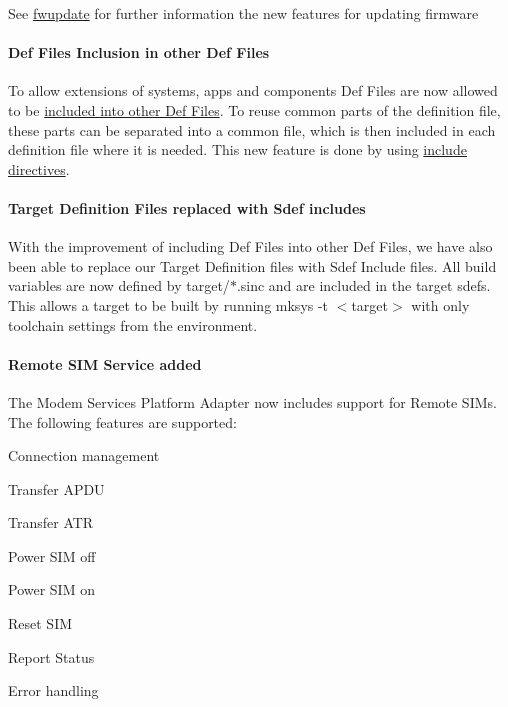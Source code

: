 See \hyperlink{c_fwupdate}{fwupdate} for further information the new features for updating firmware\hypertarget{releaseNotes17050_rn17_05_FeaturesIncDefFiles}{}\paragraph{Def Files Inclusion in other Def Files}\label{releaseNotes17050_rn17_05_FeaturesIncDefFiles}
To allow extensions of systems, apps and components Def Files are now allowed to be \hyperlink{defFilesFormat_defFileFormatIncludeDirectives}{included into other Def Files}. To reuse common parts of the definition file, these parts can be separated into a common file, which is then included in each definition file where it is needed. This new feature is done by using \hyperlink{defFilesFormat_defFileFormatIncludeDirectives}{include directives}.\hypertarget{releaseNotes17050_rn17_05_FeaturesTdefSinc}{}\paragraph{Target Definition Files replaced with Sdef includes}\label{releaseNotes17050_rn17_05_FeaturesTdefSinc}
With the improvement of including Def Files into other Def Files, we have also been able to replace our Target Definition files with Sdef Include files. All build variables are now defined by {\ttfamily target/$\ast$}.sinc and are included in the target sdef\textquotesingle{}s. This allows a target to be built by running {\ttfamily  mksys -\/t $<$target$>$ } with only toolchain settings from the environment.\hypertarget{releaseNotes17050_rn17_05_FeaturesRemoteSIM}{}\paragraph{Remote S\+I\+M Service added}\label{releaseNotes17050_rn17_05_FeaturesRemoteSIM}
The Modem Services Platform Adapter now includes support for Remote S\+I\+Ms. The following features are supported\+:
\begin{DoxyItemize}
\item Connection management
\item Transfer A\+P\+DU
\item Transfer A\+TR
\item Power S\+IM off
\item Power S\+IM on
\item Reset S\+IM
\item Report Status
\item Error handling
\end{DoxyItemize}

